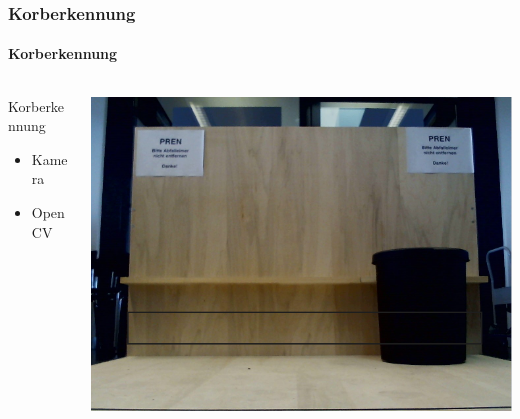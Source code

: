 \begin{frame}
    \frametitle{Korberkennung}
    \framesubtitle{Korberkennung}
    \begin{columns}
        \begin{column}{0.4\textwidth}
            \begin{block}{Korberkennung}
                \begin{itemize}
                    \item Kamera
                    \item OpenCV
                \end{itemize}
            \end{block}
        \end{column}
        \begin{column}{0.6\textwidth}
            \centering
            \includegraphics[width=1.0\textwidth]{../doc/fig/BildMitKorb_markiert.png}
        \end{column}
    \end{columns}
\end{frame}

